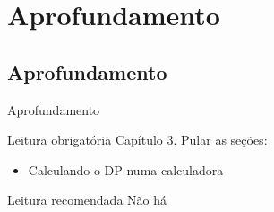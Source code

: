 \documentclass{beamer}
\begin{document}
\section{Aprofundamento}

\subsection{Aprofundamento}

\begin{frame}{\scriptsize Aprofundamento}
  \begin{block}{Leitura obrigatória}
    \footnotesize
    Capítulo 3. Pular as seções:
    \begin{itemize}
      \footnotesize
    \item Calculando o DP numa calculadora
    \end{itemize}
  \end{block}
  \begin{block}{Leitura recomendada}
    \scriptsize
    Não há
  \end{block}
\end{frame}
\end{document}

